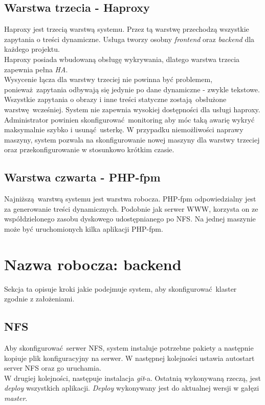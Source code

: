 \subsection{Warstwa trzecia - Haproxy}
Haproxy jest trzecią warstwą systemu.
Przez tą warstwę przechodzą wszystkie zapytania o treści dynamiczne.
Usługa tworzy osobny \textit{frontend} oraz \textit{backend} dla każdego projektu.\\
Haproxy posiada wbudowaną obsługę wykrywania, dlatego warstwa trzecia zapewnia pełna \textit{HA}.\\
Wysycenie łącza dla warstwy trzeciej nie powinna być problemem, ponieważ zapytania odbywają się jedynie po dane dynamiczne - zwykle tekstowe.
Wszystkie zapytania o obrazy i inne treści statyczne zostają obsłużone warstwę wcześniej.
System nie zapewnia wysokiej dostępności dla usługi haproxy.
Administrator powinien skonfigurować monitoring aby móc taką awarię wykryć maksymalnie szybko i usunąć usterkę.
W przypadku niemożliwości naprawy maszyny, system pozwala na skonfigurowanie nowej maszyny dla warstwy trzeciej oraz przekonfigurowanie w stosunkowo krótkim czasie.
\subsection{Warstwa czwarta - PHP-fpm}
Najniższą warstwą systemu jest warstwa robocza.
PHP-fpm odpowiedzialny jest za generowanie treści dynamicznych.
Podobnie jak serwer WWW, korzysta on ze współdzielonego zasobu dyskowego udostępnianego po NFS.
Na jednej maszynie może być uruchomionych kilka aplikacji PHP-fpm.
\section{Nazwa robocza: backend}
Sekcja ta opisuje kroki jakie podejmuje system, aby skonfigurować klaster zgodnie z założeniami.
\subsection{NFS}
Aby skonfigurować serwer NFS, system instaluje potrzebne pakiety a następnie kopiuje plik konfiguracyjny na serwer.
W następnej kolejności ustawia autostart server NFS oraz go uruchamia.\\
W drugiej kolejności, następuje instalacja \textit{git}-a.
Ostatnią wykonywaną rzeczą, jest \textit{deploy} wszystkich aplikacji.
\textit{Deploy} wykonywany jest do aktualnej wersji w gałęzi \textit{master}.
